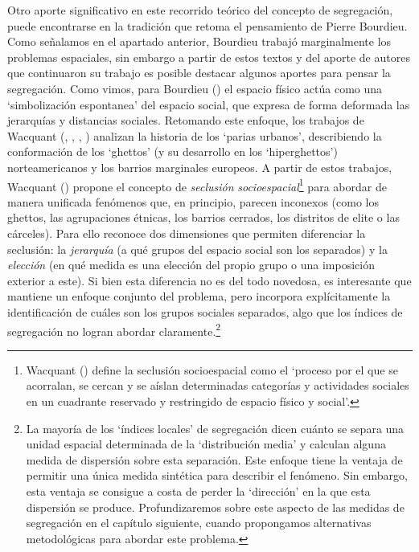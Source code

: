 \documentclass[
  spanish,
  a4paper,%
  chapterprefix=true,%
  DIV=calc,%
  twoside]{scrbook}%
\begin{document}
Otro aporte significativo en este recorrido teórico del concepto de
segregación, puede encontrarse en la tradición que retoma el pensamiento
de Pierre Bourdieu. Como señalamos en el apartado anterior, Bourdieu
trabajó marginalmente los problemas espaciales, sin embargo a partir de
estos textos y del aporte de autores que continuaron su trabajo es
posible destacar algunos aportes para pensar la segregación. Como vimos,
para Bourdieu () el espacio físico actúa como una `simbolización
espontanea' del espacio social, que expresa de forma deformada las
jerarquías y distancias sociales. Retomando este enfoque, los trabajos
de Wacquant (, , , ) analizan la historia de los `parias urbanos',
describiendo la conformación de los `ghettos' (y su desarrollo en los
`hiperghettos') norteamericanos y los barrios marginales europeos. A
partir de estos trabajos, Wacquant () propone el concepto de
\emph{seclusión} \emph{socioespacial}\footnote{Wacquant () define la seclusión
  socioespacial como el `proceso por el que se acorralan, se cercan y
  se aíslan determinadas categorías y actividades sociales en un
  cuadrante reservado y restringido de espacio físico y social'.} para abordar de manera
unificada fenómenos que, en principio, parecen inconexos (como los
ghettos, las agrupaciones étnicas, los barrios cerrados, los distritos
de elite o las cárceles). Para ello reconoce dos dimensiones que
permiten diferenciar la seclusión: la \emph{jerarquía} (a qué grupos del
espacio social son los separados) y la \emph{elección} (en qué medida es una
elección del propio grupo o una imposición exterior a este). Si bien
esta diferencia no es del todo novedosa, es interesante que mantiene un
enfoque conjunto del problema, pero incorpora explícitamente la
identificación de cuáles son los grupos sociales separados, algo que los
índices de segregación no logran abordar claramente.\footnote{La mayoría de los `índices locales' de segregación
  dicen cuánto se separa una unidad espacial determinada de la
  `distribución media' y calculan alguna medida de dispersión sobre
  esta separación. Este enfoque tiene la ventaja de permitir una única
  medida sintética para describir el fenómeno. Sin embargo, esta
  ventaja se consigue a costa de perder la `dirección' en la que esta
  dispersión se produce. Profundizaremos sobre este aspecto de las
  medidas de segregación en el capítulo siguiente, cuando propongamos
  alternativas metodológicas para abordar este problema.}
\end{document}
